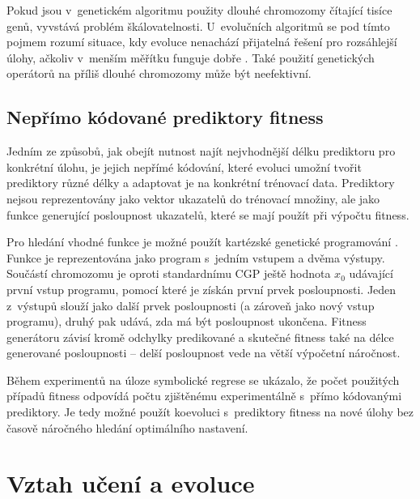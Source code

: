 Pokud jsou v~genetickém algoritmu použity dlouhé chromozomy čítající tisíce genů, vyvstává problém škálovatelnosti. U~evolučních algoritmů se pod tímto pojmem rozumí situace, kdy evoluce nenachází přijatelná řešení pro rozsáhlejší úlohy, ačkoliv v~menším měřítku funguje dobře \cite{SikuKomjathy}. Také použití genetických operátorů na příliš dlouhé chromozomy může být neefektivní.


\subsection{Nepřímo kódované prediktory fitness}
\label{secIndirectPredictors}

Jedním ze způsobů, jak obejít nutnost najít nejvhodnější délku prediktoru pro konkrétní úlohu, je jejich nepřímé kódování, které evoluci umožní tvořit prediktory různé délky a adaptovat je na konkrétní trénovací data. Prediktory nejsou reprezentovány jako vektor ukazatelů do trénovací množiny, ale jako funkce generující posloupnost ukazatelů, které se mají použít při výpočtu fitness.

Pro hledání vhodné funkce je možné použít kartézské genetické programování \cite{SikuHulva}. Funkce je reprezentována jako program s~jedním vstupem a dvěma výstupy. Součástí chromozomu je oproti standardnímu CGP ještě hodnota $x_0$ udávající první vstup programu, pomocí které je získán první prvek posloupnosti. Jeden z~výstupů slouží jako další prvek posloupnosti (a zároveň jako nový vstup programu), druhý pak udává, zda má být posloupnost ukončena. Fitness generátoru závisí kromě odchylky predikované a skutečné fitness také na délce generované posloupnosti -- delší posloupnost vede na větší výpočetní náročnost.

Během experimentů na úloze symbolické regrese se ukázalo, že počet použitých případů fitness odpovídá počtu zjištěnému experimentálně s~přímo kódovanými prediktory. Je tedy možné použít koevoluci s~prediktory fitness na nové úlohy bez časově náročného hledání optimálního nastavení.


\section{Vztah učení a evoluce}
\label{secColearning}

